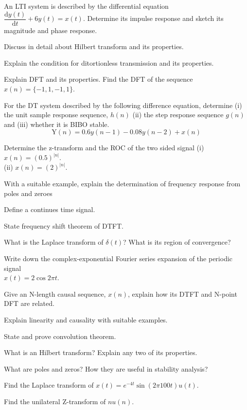 \newpage \again

\item An LTI system is described by the differential equation
  $\dfrac{\text{d}y(t)}{\text{d}t} + 6 y(t) = x(t)$. Determine its
  impulse response and sketch its magnitude and phase response.
\ene

\item \iitem Discuss in detail about Hilbert transform and its properties.
\Or
\item Explain the condition for ditortionless transmission and its properties.
\ene

\item \iitem Explain DFT and its properties. Find the DFT of the sequence
  $x(n) = \{-1, 1, -1, 1\}$.
\Or
\item For the DT system described by the following difference equation,
  determine (i) the unit sample response sequence, $h(n)$ (ii) the step
  response sequence $g(n)$ and (iii) whether it is BIBO stable.
  \[ \text{Y} (n) = 0.6y(n - 1) - 0.08y(n - 2) + x(n) \]
\ene

\item \iitem Determine the z-transform and the ROC of the two sided signal
  (i) $x(n) = (0.5)^{|n|}$.\\ (ii) $x(n) = (2)^{|n|}$.
\Or
\item With a suitable example, explain the determination of frequency
  response from poles and zeroes
\ene

\markC
\ene

\newpage

\sub{\subj}
\maxtime

\partA

\iitem Define a continues time signal.
\item State frequency shift theorem of DTFT.
\item What is the Laplace transform of $\delta (t)$? What is its region of convergence?
\item Write down the complex-exponential Fourier series expansion of the periodic
  signal\\ $x(t)=2\cos 2\pi t$.
\item Give an N-length causal sequence, $x(n)$, explain how its DTFT and N-point DFT
  are related.

\markA
\partB

\item Explain linearity and causality with suitable examples.
\item State and prove convolution theorem.
\item What is an Hilbert transform? Explain any two of its properties.
\item What are poles and zeros? How they are useful in stability analysis?
\item Find the Laplace transform of $x(t) = e^{-4t} \sin (2\pi 100t) u(t)$. 
\item Find the unilateral Z-transform of $nu(n)$.

